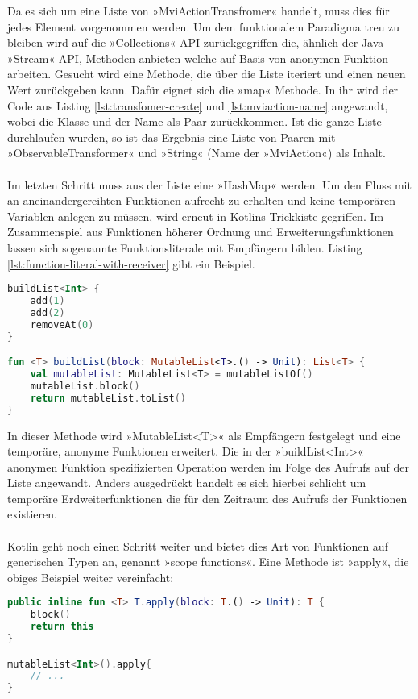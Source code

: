 \bigskip
Da es sich um eine Liste von »MviActionTransfromer« handelt, muss dies für jedes Element vorgenommen werden. Um dem funktionalem Paradigma treu zu bleiben wird auf die »Collections« API zurückgegriffen die, ähnlich der Java »Stream« API, Methoden anbieten welche auf Basis von anonymen Funktion arbeiten.
Gesucht wird eine Methode, die über die Liste iteriert und einen neuen Wert zurückgeben kann. Dafür eignet sich die »map« Methode. In ihr wird der Code aus Listing
\ref{lst:transfomer-create}
und
\ref{lst:mviaction-name}
angewandt, wobei die Klasse und der Name als Paar zurückkommen. Ist die ganze Liste durchlaufen wurden, so ist das Ergebnis eine Liste von Paaren mit »ObservableTransformer« und »String« (Name der »MviAction«) als Inhalt.
\\\\
Im letzten Schritt muss aus der Liste eine »HashMap« werden. Um den Fluss mit an aneinandergereihten Funktionen aufrecht zu erhalten und keine temporären Variablen anlegen zu müssen, wird erneut in Kotlins Trickkiste gegriffen. Im Zusammenspiel aus Funktionen höherer Ordnung und Erweiterungsfunktionen lassen sich sogenannte Funktionsliterale mit Empfängern bilden. Listing
\ref{lst:function-literal-with-receiver}
gibt ein Beispiel.
\begin{lstlisting}[caption={Funktionsliteral mit Empfänger}, label={lst:function-literal-with-receiver},language=Kotlin]
buildList<Int> {
	add(1)
	add(2)
	removeAt(0)
}

fun <T> buildList(block: MutableList<T>.() -> Unit): List<T> {
	val mutableList: MutableList<T> = mutableListOf()
	mutableList.block()
	return mutableList.toList()
}
\end{lstlisting}
\bigskip
In dieser Methode wird »MutableList<T>« als Empfängern festgelegt und eine temporäre, anonyme Funktionen erweitert. Die in der »buildList<Int>« anonymen Funktion spezifizierten Operation werden im Folge des Aufrufs auf der Liste angewandt. Anders ausgedrückt handelt es sich hierbei schlicht um temporäre Erdweiterfunktionen die für den Zeitraum des Aufrufs der Funktionen existieren.
\\\\
Kotlin geht noch einen Schritt weiter und bietet dies Art von Funktionen auf generischen Typen an, genannt »scope functions«. Eine Methode ist »apply«, die obiges Beispiel weiter vereinfacht:
\begin{lstlisting}[caption={apply Funktion}, label={lst:apply-function},language=Kotlin]
public inline fun <T> T.apply(block: T.() -> Unit): T {
	block()
	return this
}

mutableList<Int>().apply{
	// ...
}
\end{lstlisting}
